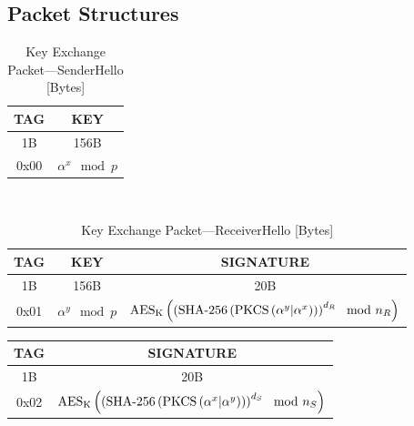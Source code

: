 \documentclass[a4paper]{article}
\begin{document}
\begin{appendices}

\section{Packet Structures}

\begin{table}[h!]
    \begin{center}
        \begin{tabular}{| c | c |}
            \hline
            TAG & KEY \\ \hline\hline
            1B & 156B \\ \hline
            0x00 & $\alpha^x\mod{p}$ \\
            \hline
        \end{tabular}
    \end{center}
    \
    \caption{Key Exchange Packet---SenderHello [Bytes]}
    \label{tab:key_exchange_packet_senderhello}
\end{table}
\begin{table}[h!]
    \begin{center}
        \begin{tabular}{| c | c | c |}
            \hline
            TAG & KEY & SIGNATURE \\ \hline\hline
            1B & 156B & 20B \\ \hline
            0x01 & $\alpha^y\mod{p}$ & $\text{AES}_\text{K}\left(\left(\text{SHA-256}\left(\text{PKCS}\left(\alpha^y\small|\alpha^x\right)\right)\right)^{d_R}\mod{n_R}\right)$\\
            \hline
        \end{tabular}
    \end{center}
    
    \caption{Key Exchange Packet---ReceiverHello [Bytes]}
    \label{tab:key_exchange_packet_receiverhello}
\end{table}
\begin{table}[h!]
    \begin{center}
        \begin{tabular}{| c | c |}
            \hline
            TAG & SIGNATURE \\ \hline\hline
            1B & 20B \\ \hline
            0x02 & $\text{AES}_\text{K}\left(\left(\text{SHA-256}\left(\text{PKCS}\left(\alpha^x \small|\alpha^y\right)\right)\right)^{d_S}\mod{n_S}\right)$\\
            \hline
        \end{tabular}
    \end{center}


\end{table}
\end{appendices}
\end{document}
